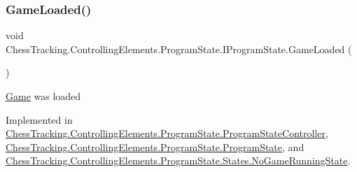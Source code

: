 \mbox{\label{interface_chess_tracking_1_1_controlling_elements_1_1_program_state_1_1_i_program_state_afaaa62756391f219e5318342f9bb568a}} 
\subsubsection{\texorpdfstring{GameLoaded()}{GameLoaded()}}
{\footnotesize\ttfamily void Chess\+Tracking.\+Controlling\+Elements.\+Program\+State.\+I\+Program\+State.\+Game\+Loaded (\begin{DoxyParamCaption}{ }\end{DoxyParamCaption})}



\mbox{\hyperlink{namespace_chess_tracking_1_1_game}{Game}} was loaded 



Implemented in \mbox{\hyperlink{class_chess_tracking_1_1_controlling_elements_1_1_program_state_1_1_program_state_controller_a48d65a925eb5a5f38a874e486a4477e2}{Chess\+Tracking.\+Controlling\+Elements.\+Program\+State.\+Program\+State\+Controller}}, \mbox{\hyperlink{class_chess_tracking_1_1_controlling_elements_1_1_program_state_1_1_program_state_ae44259fd379473c103e8957d51832de9}{Chess\+Tracking.\+Controlling\+Elements.\+Program\+State.\+Program\+State}}, and \mbox{\hyperlink{class_chess_tracking_1_1_controlling_elements_1_1_program_state_1_1_states_1_1_no_game_running_state_a1e892271241639d1e2a77739a8e58892}{Chess\+Tracking.\+Controlling\+Elements.\+Program\+State.\+States.\+No\+Game\+Running\+State}}.

\mbox{\label{interface_chess_tracking_1_1_controlling_elements_1_1_program_state_1_1_i_program_state_a4b28776980cafc1555ae100548aaf046}} 
